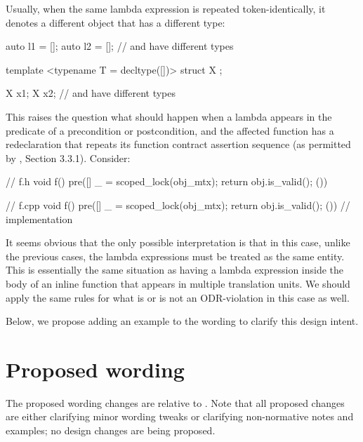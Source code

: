 Usually, when the same lambda expression is repeated token-identically, it denotes a different object that has a different type:
\begin{codeblock}
auto l1 = []{};  
auto l2 = []{};
//  and  have different types

template <typename T = decltype([]{})>
struct X {};

X x1;
X x2;
//  and  have different types
\end{codeblock}
This raises the question what should happen when a lambda appears in the predicate of a precondition or postcondition, and the affected function has a redeclaration that repeats its function contract assertion sequence (as permitted by \cite{P2900R10}, Section 3.3.1). Consider:
\begin{codeblock}
// f.h
void f() pre([]{ _ = scoped_lock(obj_mtx); return obj.is_valid(); }())

// f.cpp  
void f() pre([]{ _ = scoped_lock(obj_mtx); return obj.is_valid(); }()) {
  // implementation
}
\end{codeblock}
It seems obvious that the only possible interpretation is that in this case, unlike the previous cases, the lambda expressions must be treated as the same entity. This is essentially the same situation as having a lambda expression inside the body of an inline function that appears in multiple translation units. We should apply the same rules for what is or is not an ODR-violation in this case as well.

Below, we propose adding an example to the wording to clarify this design intent.

\section{Proposed wording}

The proposed wording changes are relative to \cite{P2900R10}. Note that all proposed changes are either clarifying minor wording tweaks or clarifying non-normative notes and examples; no design changes are being proposed.

